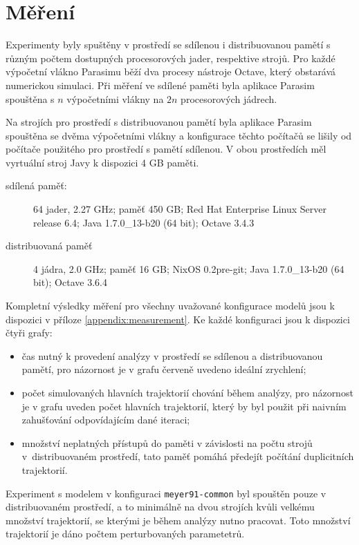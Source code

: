\section{Měření}\label{section:measurement}

Experimenty byly spuštěny v prostředí se sdílenou i distribuovanou pamětí s různým
počtem dostupných procesorových jader, respektive strojů. Pro každé výpočetní vlákno
Parasimu běží dva procesy nástroje Octave, který obstarává numerickou simulaci. Při měření
ve sdílené paměti byla aplikace Parasim spouštěna s $n$ výpočetními vlákny na $2n$
procesorových jádrech.

Na strojích pro prostředí s distribuovanou pamětí byla aplikace Parasim spouštěna se dvěma
výpočetními vlákny a konfigurace těchto počítačů se lišily od počítače použitého pro prostředí
s pamětí sdílenou. V obou prostředích měl vyrtuální stroj Javy k dispozici 4 GB paměti.

\begin{description}
	\item[sdílená paměť: ]
		 64 jader, 2.27 GHz; paměť 450 GB; Red Hat Enterprise Linux Server release 6.4; Java 1.7.0\_13-b20 (64 bit); Octave 3.4.3
	\item[distribuovaná paměť]
		4 jádra, 2.0 GHz; paměť 16 GB; NixOS 0.2pre-git; Java 1.7.0\_13-b20 (64 bit); Octave 3.6.4
\end{description}

Kompletní výsledky měření pro všechny uvažované konfigurace modelů jsou k dispozici
v příloze \ref{appendix:measurement}. Ke každé konfiguraci jsou k dispozici čtyři grafy:

\begin{itemize}
	\item	čas nutný k provedení analýzy v prostředí se sdílenou a distribuovanou pamětí,
			pro názornost je v grafu červeně uvedeno ideální zrychlení;
	\item	počet simulovaných hlavních trajektorií chování během analýzy, pro názornost je v grafu
			uveden počet hlavních trajektorií, který by byl použit při naivním zahušťování odpovídajícím
			dané iteraci;
	\item	množství neplatných přístupů do paměti v závislosti na počtu strojů v~dis\-tri\-buova\-ném prostředí,
			tato paměť pomáhá předejít po\-čí\-tá\-ní duplicitních trajektorií.
\end{itemize}

Experiment s modelem v konfiguraci \texttt{meyer91-common} byl spouštěn pouze v distribuovaném prostředí,
a to minimálně na dvou strojích kvůli velkému množství trajektorií, se kterými je během analýzy nutno
pracovat. Toto množství trajektorií je dáno počtem perturbovaných parametetrů.

